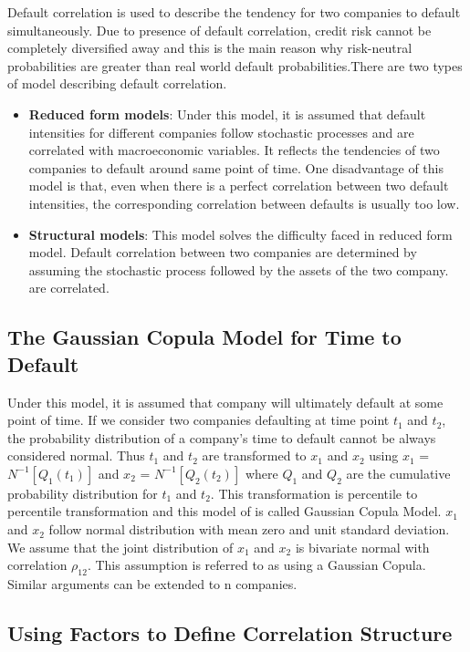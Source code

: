 \documentclass[11pt]{article}
\numberwithin{equation}{section}
\begin{document}
Default correlation is used to describe the tendency for two companies to default simultaneously. Due to presence of default correlation, credit risk cannot be completely diversified away and this is the main reason why
risk-neutral probabilities are greater than real world default
probabilities.There are two types of model describing default correlation.
\begin{itemize}
\item \textbf{Reduced form models}: Under this model, it is assumed that default intensities for different companies follow stochastic processes and are correlated with macroeconomic variables. It reflects the tendencies of two companies to default around same point
of time. One disadvantage of this model is that, even when there is a perfect correlation between two default intensities, the corresponding correlation between defaults is usually too low.

\item \textbf{Structural models}: This model solves the difficulty faced in reduced form model. Default correlation between two companies are determined by assuming the stochastic process followed by the assets of the two company. 
are correlated.
\end{itemize}
\subsection{The Gaussian Copula Model for Time to Default}
\medskip

Under this model, it is assumed that company will ultimately default at some point of time. If we consider two companies defaulting at time point $t_1$ and $t_2$, the probability distribution of a company's time to default cannot be always considered normal. Thus $t_1$ and $ t_2 $ are transformed to $x_1$ and $x_2$ using $x_1$ = $N^{-1}[Q_1(t_1)]$ and $x_2$ = $N^{-1}[Q_2(t_2)]$ where $Q_1$ and $Q_2$ are the cumulative probability distribution for $t_1$ and $t_2$. This transformation is percentile to percentile transformation and this model of is called Gaussian Copula Model. $x_1$ and $x_2$  follow normal distribution with mean zero and unit standard deviation. We assume that the joint distribution of $x_1$ and $x_2$ is bivariate normal with correlation $\rho_{12} $. This assumption is referred to as using a Gaussian Copula. Similar arguments can be extended to n companies. 

\subsection{Using Factors to Define Correlation Structure}
\medskip
\end{document}
